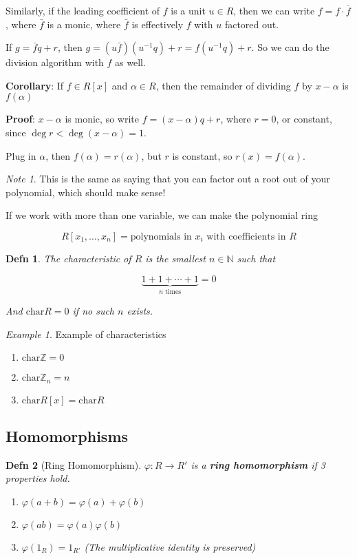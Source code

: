 \documentclass[12pt]{article}
\def\char{\text{char}}
\def\N{{\mathbb N}}
\def\Z{{\mathbb Z}}
\newtheorem{definition}{Defn}
\theoremstyle{remark}
\theoremstyle{remark}
\theoremstyle{remark}
\newtheorem{example}{Example}
\theoremstyle{remark}
\theoremstyle{remark}
\newtheorem*{note}{Note}
\begin{document}
Similarly, if the leading coefficient of $f$ is a unit $u \in R$, then we can
write $f = f \cdot \bar f$, where $\bar f$ is a monic, where $\bar f$ is
effectively $f$ with $u$ factored out.

If $g = \bar f q + r$, then $g = (u \bar f)(u^{-1} q) + r = f(u^{-1} q) + r$. So
we can do the division algorithm with $f$ as well.

{\bf Corollary}: If $f \in R[x]$ and $\alpha \in R$, then the remainder of
dividing $f$ by $x - \alpha$ is $f(\alpha)$

{\bf Proof}: $x - \alpha$ is monic, so write $f = (x - \alpha)q + r$, where $r =
0$, or constant, since $\deg r < \deg (x - \alpha) = 1$.

Plug in $\alpha$, then $f(\alpha) = r(\alpha)$, but $r$ is constant, so $r(x) =
f(\alpha)$.

\begin{note}
  This is the same as saying that you can factor out a root out of your
  polynomial, which should make sense!
\end{note}

If we work with more than one variable, we can make the polynomial ring

\[
  R[x_1, \dots, x_n] = \text{polynomials in $x_i$ with coefficients in $R$}
\]

\begin{definition}
  The characteristic of $R$ is the smallest $n \in \N$ such that 

  \[
    \underbrace{1 + 1 + \cdots + 1}_{\text{$n$ times}} = 0
  \]

  And $\char R = 0$ if no such $n$ exists.
\end{definition}

\begin{example}
  Example of characteristics

  \begin{enumerate}
    \item $\char \Z = 0$
    \item $\char \Z_n = n$
    \item $\char R[x] = \char R$
  \end{enumerate}
\end{example}

\subsection{Homomorphisms}

\begin{definition}[Ring Homomorphism]
  $\varphi: R \to R'$ is a {\bf ring homomorphism} if 3 properties hold.

  \begin{enumerate}
    \item $\varphi(a + b) = \varphi(a) + \varphi(b)$
    \item $\varphi(ab) = \varphi(a)\varphi(b)$
    \item $\varphi(1_R) = 1_{R'}$ (The multiplicative identity is preserved)
  \end{enumerate}
\end{definition}
\end{document}
